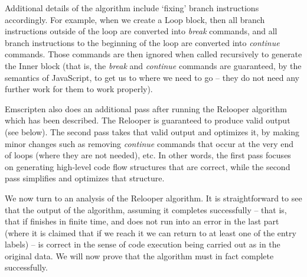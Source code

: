 \documentclass[11pt]{proc}
\begin{document}
Additional details of the algorithm include `fixing' branch
instructions accordingly. For example, when we create a Loop
block, then all branch instructions outside of the loop are
converted into \emph{break} commands, and all branch
instructions to the beginning of the loop are converted into
\emph{continue} commands. Those commands are then
ignored when called recursively to generate the Inner block (that is,
the \emph{break} and \emph{continue}
commands are guaranteed, by the semantics of JavaScript, to get us to
where we need to go -- they do not need any further work
for them to work properly).

Emscripten also does an additional pass after running the Relooper algorithm
which has been described. The Relooper is guaranteed to produce valid output (see below).
The second pass takes that valid output and optimizes it, by
making minor changes such as removing
\emph{continue} commands that occur at the very end of loops
(where they are not needed), etc. In other words, the first pass focuses on
generating high-level code flow structures that are correct,
while the second pass simplifies and optimizes that structure.

We now turn to an analysis of the Relooper algorithm. It is straightforward to see that the output of the algorithm,
assuming it completes successfully -- that is, that if finishes in finite time, and does
not run into an error in the last part (where it is claimed that
if we reach it we can return to at least one of the entry labels) --
is correct in the sense of code execution being carried out
as in the original data. We will now prove that the algorithm must
in fact complete successfully.
\end{document}
